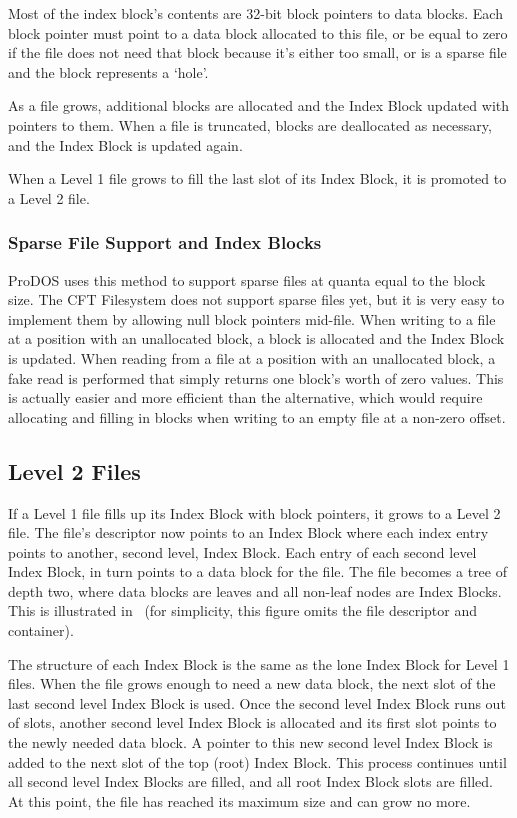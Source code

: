 Most of the index block's contents are 32-bit \glspl{block pointer} to
data blocks. Each block pointer must point to a data block allocated
to this file, or be equal to zero if the file does not need that block
because it's either too small, or is a sparse file and the block
represents a ‘hole’.

As a file grows, additional blocks are allocated and the Index Block
updated with pointers to them. When a file is truncated, blocks are
deallocated as necessary, and the Index Block is updated again.

When a Level 1 file grows to fill the last slot of its Index Block, it
is promoted to a Level 2 file.

\newpage
\subsubsection{Sparse File Support and Index Blocks}


ProDOS uses this method to support sparse files at quanta equal to the
block size. The CFT Filesystem does not support sparse files yet, but
it is very easy to implement them by allowing null block pointers
mid-file. When writing to a file at a position with an unallocated
block, a block is allocated and the Index Block is updated. When
reading from a file at a position with an unallocated block, a fake
read is performed that simply returns one block's worth of zero
values. This is actually easier and more efficient than the
alternative, which would require allocating and filling in blocks when
writing to an empty file at a non-zero offset.

\subsection{Level 2 Files}

If a Level 1 file fills up its Index Block with \glspl{block pointer},
it grows to a Level 2 file. The file's \gls{descriptor} now points to
an Index Block where each index entry points to another, second level,
Index Block. Each entry of each second level Index Block, in turn
points to a data block for the file. The file becomes a tree of depth
two, where data blocks are leaves and all non-leaf nodes are Index
Blocks.  This is illustrated in~ (for simplicity,
this figure omits the file \gls{descriptor} and container).

The structure of each Index Block is the same as the lone Index Block
for Level 1 files. When the file grows enough to need a new data
block, the next slot of the last second level Index Block is
used. Once the second level Index Block runs out of slots, another
second level Index Block is allocated and its first slot points to the
newly needed data block. A pointer to this new second level Index
Block is added to the next slot of the top (root) Index Block. This
process continues until all second level Index Blocks are filled, and
all root Index Block slots are filled. At this point, the file has
reached its maximum size and can grow no more.


